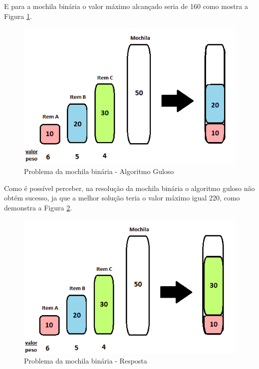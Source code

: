 E para a mochila binária o valor máximo alcançado seria de 160 como mostra a Figura \ref{mochilabinaria}.

\FloatBarrier
\begin{figure}[!h]
\centering
\includegraphics[keepaspectratio=true,scale=0.5]{figuras/mochilabinaria.png}
\caption{Problema da mochila binária - Algoritmo Guloso}
\label{mochilabinaria}
\end{figure}
\clearpage

Como é possível perceber, na resolução da mochila binária o algoritmo guloso não obtém sucesso, ja que a melhor solução teria o valor máximo igual 220, como demonstra a Figura \ref{mochilabinariacerta}.

\FloatBarrier
\begin{figure}[!h]
\centering
\includegraphics[keepaspectratio=true,scale=0.5]{figuras/mochilabinariacerta.png}
\caption{Problema da mochila binária - Resposta}
\label{mochilabinariacerta}
\end{figure}

